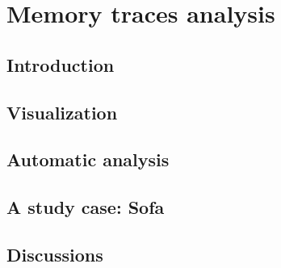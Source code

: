 \chapter{Memory traces analysis}


\section{Introduction}


\section{Visualization}


\section{Automatic analysis}


\section{A study case: Sofa}



\section{Discussions}

